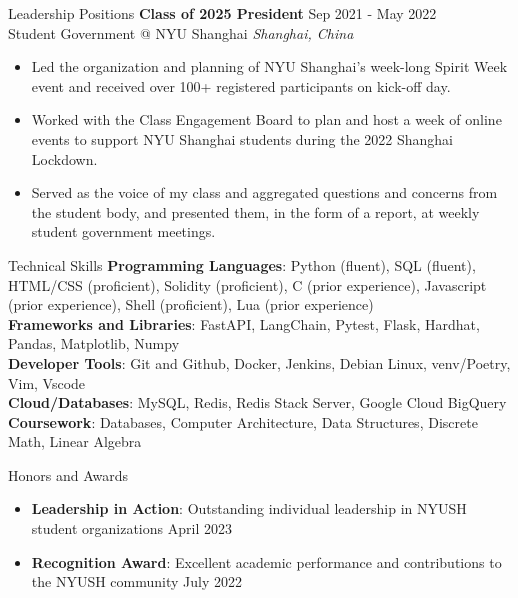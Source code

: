 \documentclass{cv} %
\begin{document}
\begin{rSection}{Leadership Positions}
	\textbf{Class of 2025 President} \hfill Sep 2021 - May 2022 \\
	Student Government @ NYU Shanghai \hfill \textit{Shanghai, China}
	\begin{itemize}
		\item Led the organization and planning of NYU Shanghai’s week-long Spirit Week event and received over 100+ registered participants on kick-off day.
		\item Worked with the Class Engagement Board to plan and host a week of online events to support NYU Shanghai students during the 2022 Shanghai Lockdown.
		\item Served as the voice of my class and aggregated questions and concerns from the student body, and presented them, in the form of a report, at weekly student government meetings.
	\end{itemize}

\end{rSection}


\begin{rSection}{Technical Skills}
	\textbf{Programming Languages}{: Python (fluent), SQL (fluent), HTML/CSS (proficient), Solidity (proficient), C (prior experience),  Javascript (prior experience), Shell  (proficient), Lua (prior experience)} \\
	\textbf{Frameworks and Libraries}{: FastAPI, LangChain, Pytest, Flask, Hardhat, Pandas, Matplotlib, Numpy} \\
	\textbf{Developer Tools}{: Git and Github, Docker, Jenkins, Debian Linux, venv/Poetry, Vim, Vscode} \\
	\textbf{Cloud/Databases}{: MySQL, Redis, Redis Stack Server, Google Cloud BigQuery} \\
	\textbf{Coursework}{: Databases, Computer Architecture, Data Structures, Discrete Math, Linear Algebra}
\end{rSection}

\begin{rSection}{Honors and Awards}
	\begin{itemize}
		\item \textbf{Leadership in Action}{: Outstanding individual leadership in NYUSH student organizations} \hfill April 2023
		\item \textbf{Recognition Award}{: Excellent academic performance and contributions to the NYUSH community} \hfill July 2022
	\end{itemize}
\end{rSection}
\end{document}
